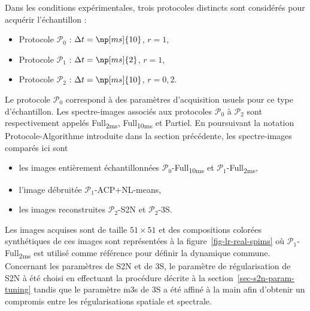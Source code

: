 Dans les conditions expérimentales, trois protocoles distincts sont considérés pour acquérir l'échantillon :
\begin{itemize}
    \item Protocole $\mathcal{P}_0$ : $\Delta t=\np[ms]{10}$, $r = 1$,
    \item Protocole $\mathcal{P}_1$ : $\Delta t=\np[ms]{2}$, $r = 1$,
    \item Protocole $\mathcal{P}_2$ : $\Delta t=\np[ms]{10}$, $r = 0,2$.
\end{itemize}
Le protocole $\mathcal{P}_0$ correspond à des paramètres d'acquisition usuels pour ce type d'échantillon. Les spectre-images associés aux protocoles $\mathcal{P}_0$ à $\mathcal{P}_2$ sont respectivement appelés Full\textsubscript{2ms}, Full\textsubscript{10ms} et Partiel. En poursuivant la notation Protocole-Algorithme introduite dans la section précédente, les spectre-images comparés ici sont
\begin{itemize}
    \item les images entièrement échantillonnées $\mathcal{P}_0$-Full\textsubscript{10ms} et $\mathcal{P}_1$-Full\textsubscript{2ms},
    \item l'image débruitée $\mathcal{P}_1$-ACP+NL-means,
   \item  les images reconstruites $\mathcal{P}_2$-S2N et $\mathcal{P}_2$-3S.
\end{itemize}
Les images acquises sont de taille $51\times 51$ et des compositions colorées synthétiques de ces images sont représentées à la figure~\ref{fig-lr-real-spims} où $\mathcal{P}_1$-Full\textsubscript{2ms} est utilisé comme référence pour définir la dynamique commune. Concernant les paramètres de S2N et de 3S, le paramètre de régularisation de S2N à été choisi en effectuant la procédure décrite à la section~\ref{sec-s2n-param-tuning} tandis que le paramètre \gls{m3s} de 3S a été affiné à la main afin d'obtenir un compromis entre les régularisations spatiale et spectrale.

